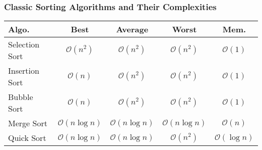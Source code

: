\documentclass[compress,12pt]{beamer}
\begin{document}
\begin{frame}
    \frametitle{Classic Sorting Algorithms and Their Complexities}
    \begin{table}
        \begin{tabular}{lcccc}
            \toprule
            Algo. & Best & Average & Worst & Mem. \\
            \midrule
            Selection Sort & $\mathcal{O}(n^2)$ & $\mathcal{O}(n^2)$ & $\mathcal{O}(n^2)$ & $\mathcal{O}(1)$ \\
            Insertion Sort & $\mathcal{O}(n)$ & $\mathcal{O}(n^2)$ & $\mathcal{O}(n^2)$ & $\mathcal{O}(1)$ \\
            Bubble Sort & $\mathcal{O}(n)$ & $\mathcal{O}(n^2)$ & $\mathcal{O}(n^2)$ & $\mathcal{O}(1)$ \\
            Merge Sort & $\mathcal{O}(n \log n)$ & $\mathcal{O}(n \log n)$ & $\mathcal{O}(n \log n)$ & $\mathcal{O}(n)$ \\
            Quick Sort & $\mathcal{O}(n \log n)$ & $\mathcal{O}(n \log n)$ & $\mathcal{O}(n^2)$ & $\mathcal{O}(\log n)$ \\
            \bottomrule
        \end{tabular}
    \end{table}
\end{frame}
\end{document}
